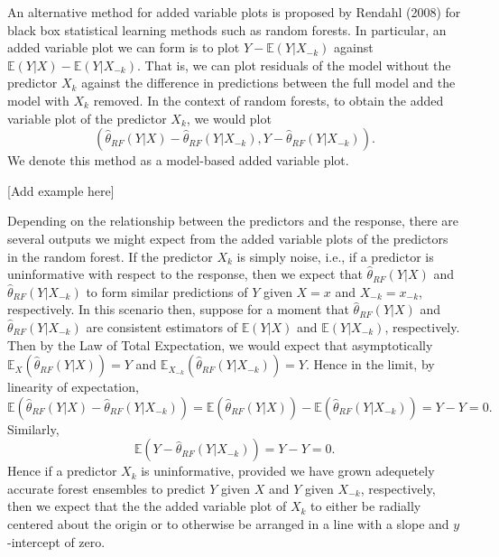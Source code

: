 \documentclass[12pt,twoside]{reedthesis}
\theoremstyle{definition}
\theoremstyle{definition}
\theoremstyle{definition}
\theoremstyle{remark}
\begin{document}
An alternative method for added variable plots is proposed by Rendahl
(2008) for black box statistical learning methods such as random
forests. In particular, an added variable plot we can form is to plot
\(Y-\mathbb{E}(Y|X_{-k})\) against
\(\mathbb{E}(Y|X)-\mathbb{E}(Y|X_{-k})\). That is, we can plot residuals
of the model without the predictor \(X_k\) against the difference in
predictions between the full model and the model with \(X_k\) removed.
In the context of random forests, to obtain the added variable plot of
the predictor \(X_k\), we would plot
\[(\hat{\theta}_{RF}(Y|X)-\hat{\theta}_{RF}(Y|X_{-k}), Y-\hat{\theta}_{RF}(Y|X_{-k})).\]
We denote this method as a model-based added variable plot. \par

{[}Add example here{]} \par

Depending on the relationship between the predictors and the response,
there are several outputs we might expect from the added variable plots
of the predictors in the random forest. If the predictor \(X_k\) is
simply noise, i.e., if a predictor is uninformative with respect to the
response, then we expect that \(\hat{\theta}_{RF}(Y|X)\) and
\(\hat{\theta}_{RF}(Y|X_{-k})\) to form similar predictions of \(Y\)
given \(X=x\) and \(X_{-k}=x_{-k}\), respectively. In this scenario
then, suppose for a moment that \(\hat{\theta}_{RF}(Y|X)\) and
\(\hat{\theta}_{RF}(Y|X_{-k})\) are consistent estimators of
\(\mathbb{E}(Y|X)\) and \(\mathbb{E}(Y|X_{-k})\), respectively. Then by
the Law of Total Expectation, we would expect that asymptotically
\(\mathbb{E}_X(\hat{\theta}_{RF}(Y|X))=Y\) and
\(\mathbb{E}_{X_{-k}}(\hat{\theta}_{RF}(Y|X_{-k}))=Y\). Hence in the
limit, by linearity of expectation,
\[\mathbb{E}(\hat{\theta}_{RF}(Y|X)-\hat{\theta}_{RF}(Y|X_{-k}))=\mathbb{E}(\hat{\theta}_{RF}(Y|X))-\mathbb{E}(\hat{\theta}_{RF}(Y|X_{-k}))=Y-Y=0.\]
Similarly, \[\mathbb{E}(Y-\hat{\theta}_{RF}(Y|X_{-k}))=Y-Y=0.\] Hence if
a predictor \(X_k\) is uninformative, provided we have grown adequetely
accurate forest ensembles to predict \(Y\) given \(X\) and \(Y\) given
\(X_{-k}\), respectively, then we expect that the the added variable
plot of \(X_k\) to either be radially centered about the origin or to
otherwise be arranged in a line with a slope and \(y\)-intercept of
zero. \par
\end{document}
